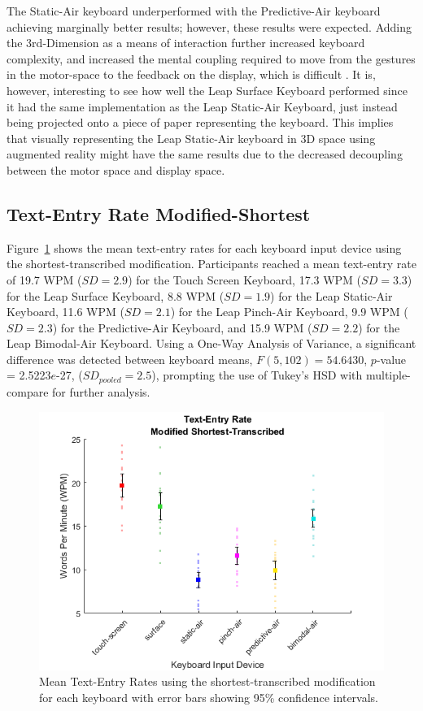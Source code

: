 The Static-Air keyboard underperformed with the Predictive-Air keyboard achieving marginally better results; however, these results were expected. Adding the 3rd-Dimension as a means of interaction further increased keyboard complexity, and increased the mental coupling required to move from the gestures in the motor-space to the feedback on the display, which is difficult \cite{ref_vulture,ref_stimulus_response_compatibility}. It is, however, interesting to see how well the Leap Surface Keyboard performed since it had the same implementation as the Leap Static-Air Keyboard, just instead being projected onto a piece of paper representing the keyboard. This implies that visually representing the Leap Static-Air keyboard in 3D space using augmented reality might have the same results due to the decreased decoupling between the motor space and display space.

\subsection{Text-Entry Rate Modified-Shortest}
Figure~\ref{fig_textentry_short_mean} shows the mean text-entry rates for each keyboard input device using the shortest-transcribed modification. Participants reached a mean text-entry rate of 19.7 WPM ($SD = 2.9$) for the Touch Screen Keyboard, 17.3 WPM ($SD = 3.3$) for the Leap Surface Keyboard, 8.8 WPM ($SD = 1.9$) for the Leap Static-Air Keyboard, 11.6 WPM ($SD = 2.1$) for the Leap Pinch-Air Keyboard, 9.9 WPM ($SD = 2.3$) for the Predictive-Air Keyboard, and 15.9 WPM ($SD = 2.2$) for the Leap Bimodal-Air Keyboard. Using a One-Way Analysis of Variance, a significant difference was detected between keyboard means, $F(5, 102) = 54.6430$, $p$-value = 2.5223$e$-27, ($SD_{pooled} = 2.5$), prompting the use of Tukey's HSD with multiple-compare for further analysis.

\begin{figure}[h]
	\centering
	\includegraphics{fig_textentry_short_mean}
	\caption[Mean Text-Entry Rates for Modified-Shortest]{Mean Text-Entry Rates using the shortest-transcribed modification for each keyboard with error bars showing 95\% confidence intervals.}
	\label{fig_textentry_short_mean}
\end{figure}


